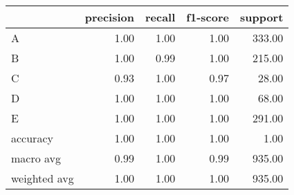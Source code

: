 \begin{tabular}{|l|r|r|r|r|}
\hline
{} &  precision &  recall &  f1-score &  support \\
\hline
A            &       1.00 &    1.00 &      1.00 &   333.00 \\
B            &       1.00 &    0.99 &      1.00 &   215.00 \\
C            &       0.93 &    1.00 &      0.97 &    28.00 \\
D            &       1.00 &    1.00 &      1.00 &    68.00 \\
E            &       1.00 &    1.00 &      1.00 &   291.00 \\
accuracy     &       1.00 &    1.00 &      1.00 &     1.00 \\
macro avg    &       0.99 &    1.00 &      0.99 &   935.00 \\
weighted avg &       1.00 &    1.00 &      1.00 &   935.00 \\
\hline
\end{tabular}
